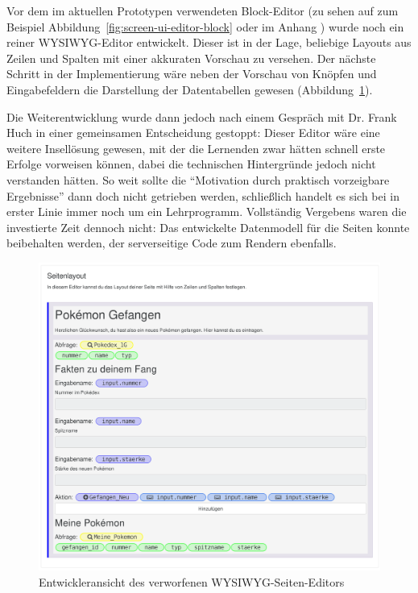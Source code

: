 Vor dem im aktuellen Prototypen verwendeten Block-Editor (zu sehen auf zum Beispiel Abbildung~\ref{fig:screen-ui-editor-block} oder im Anhang ) wurde noch ein reiner WYSIWYG-Editor entwickelt. Dieser ist in der Lage, beliebige Layouts aus Zeilen und Spalten mit einer akkuraten Vorschau zu versehen. Der nächste Schritt in der Implementierung wäre neben der Vorschau von Knöpfen und Eingabefeldern die Darstellung der Datentabellen gewesen (Abbildung~\ref{fig:discarded-wysiwyg-page-editor}).

Die Weiterentwicklung wurde dann jedoch nach einem Gespräch mit Dr. Frank Huch in einer gemeinsamen Entscheidung gestoppt: Dieser Editor wäre eine weitere Insellösung gewesen, mit der die Lernenden zwar hätten schnell erste Erfolge vorweisen können, dabei die technischen Hintergründe jedoch nicht verstanden hätten. So weit sollte die "`Motivation durch praktisch vorzeigbare Ergebnisse"' dann doch nicht getrieben werden, schließlich handelt es sich bei \idename{} in erster Linie immer noch um ein Lehrprogramm. Vollständig Vergebens waren die investierte Zeit dennoch nicht: Das entwickelte Datenmodell für die Seiten konnte beibehalten werden, der serverseitige Code zum Rendern ebenfalls.

\begin{figure}[p]
  \centering \includegraphics[width=\textwidth]{images/screenshots/20160731/esqulino-editor-page-keyboard-input-partial}
  \caption{Entwickleransicht des verworfenen WYSIWYG-Seiten-Editors}
  \label{fig:discarded-wysiwyg-page-editor}
\end{figure}

